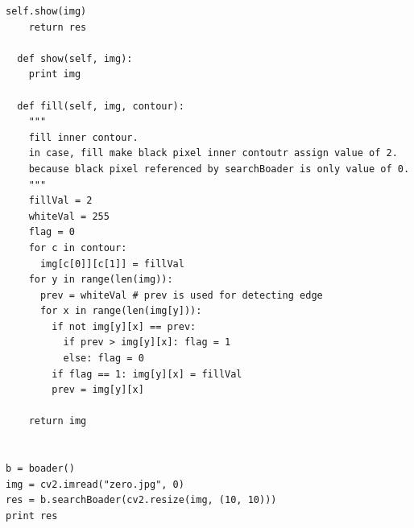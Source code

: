 \documentclass{jsarticle}
\begin{document}
\begin{lstlisting}[caption=輪郭抽出アルゴリズム,label=contour]
    self.show(img)
    return res

  def show(self, img):
    print img

  def fill(self, img, contour):
    """
    fill inner contour.
    in case, fill make black pixel inner contoutr assign value of 2.
    because black pixel referenced by searchBoader is only value of 0.
    """
    fillVal = 2
    whiteVal = 255
    flag = 0
    for c in contour:
      img[c[0]][c[1]] = fillVal
    for y in range(len(img)):
      prev = whiteVal # prev is used for detecting edge
      for x in range(len(img[y])):
        if not img[y][x] == prev:
          if prev > img[y][x]: flag = 1
          else: flag = 0
        if flag == 1: img[y][x] = fillVal
        prev = img[y][x]

    return img


b = boader()
img = cv2.imread("zero.jpg", 0)
res = b.searchBoader(cv2.resize(img, (10, 10)))
print res
\end{lstlisting}
\end{document}
